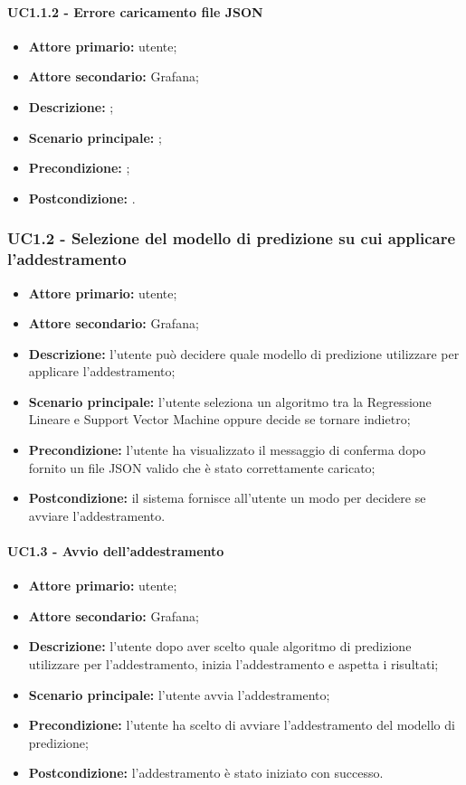 \documentclass{article}
\begin{document}
	\paragraph{UC1.1.2 - Errore caricamento file JSON}
	\begin{itemize}
		\item \textbf{Attore primario:} utente;
		\item \textbf{Attore secondario:} Grafana;
		\item \textbf{Descrizione:} ;
		\item \textbf{Scenario principale:} ;
		\item \textbf{Precondizione:} ;
		\item \textbf{Postcondizione:} .
	\end{itemize}

	\subsubsection{UC1.2 - Selezione del modello di predizione su cui applicare l'addestramento}
	\begin{itemize}
		\item \textbf{Attore primario:} utente;
		\item \textbf{Attore secondario:} Grafana;
		\item \textbf{Descrizione:} l'utente può decidere quale modello di predizione utilizzare per applicare l'addestramento;
		\item \textbf{Scenario principale:} l'utente seleziona un algoritmo tra la Regressione Lineare e Support Vector Machine oppure decide se tornare indietro;
		\item \textbf{Precondizione:} l'utente ha visualizzato il messaggio di conferma dopo fornito un file JSON valido che è stato correttamente caricato;
		\item \textbf{Postcondizione:} il sistema fornisce all'utente un modo per decidere se avviare l'addestramento.
	\end{itemize}

	\paragraph{UC1.3 - Avvio dell'addestramento}
	\begin{itemize}
		\item \textbf{Attore primario:} utente;
		\item \textbf{Attore secondario:} Grafana;
		\item \textbf{Descrizione:} l'utente dopo aver scelto quale algoritmo di predizione utilizzare per l'addestramento, inizia l'addestramento e aspetta i risultati;
		\item \textbf{Scenario principale:} l'utente avvia l'addestramento; 
		\item \textbf{Precondizione:} l'utente ha scelto di avviare l'addestramento del modello di predizione;
		\item \textbf{Postcondizione:} l'addestramento è stato iniziato con successo.
	\end{itemize}
\end{document}
